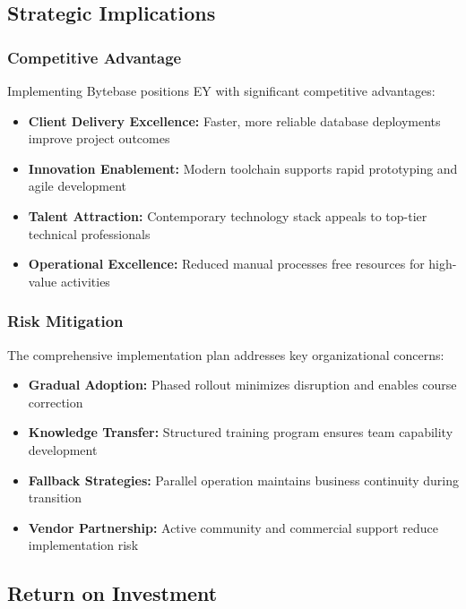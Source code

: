 \subsection{Strategic Implications}

\subsubsection{Competitive Advantage}
Implementing Bytebase positions EY with significant competitive advantages:
\begin{itemize}
    \item \textbf{Client Delivery Excellence:} Faster, more reliable database deployments improve project outcomes
    \item \textbf{Innovation Enablement:} Modern toolchain supports rapid prototyping and agile development
    \item \textbf{Talent Attraction:} Contemporary technology stack appeals to top-tier technical professionals
    \item \textbf{Operational Excellence:} Reduced manual processes free resources for high-value activities
\end{itemize}

\subsubsection{Risk Mitigation}
The comprehensive implementation plan addresses key organizational concerns:
\begin{itemize}
    \item \textbf{Gradual Adoption:} Phased rollout minimizes disruption and enables course correction
    \item \textbf{Knowledge Transfer:} Structured training program ensures team capability development
    \item \textbf{Fallback Strategies:} Parallel operation maintains business continuity during transition
    \item \textbf{Vendor Partnership:} Active community and commercial support reduce implementation risk
\end{itemize}

\subsection{Return on Investment}

